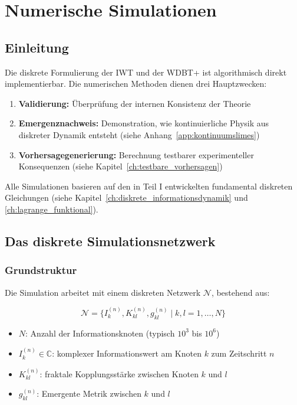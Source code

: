 
\chapter{Numerische Simulationen}
\label{app:numerik}

\section{Einleitung}
\label{app:numerik_einleitung}

Die diskrete Formulierung der IWT und der WDBT+ ist algorithmisch direkt implementierbar. Die numerischen Methoden dienen drei Hauptzwecken:

\begin{enumerate}
    \item \textbf{Validierung:} Überprüfung der internen Konsistenz der Theorie
    \item \textbf{Emergenznachweis:} Demonstration, wie kontinuierliche Physik aus diskreter Dynamik entsteht (siehe Anhang~\ref{app:kontinuumslimes})
    \item \textbf{Vorhersagegenerierung:} Berechnung testbarer experimenteller Konsequenzen (siehe Kapitel~\ref{ch:testbare_vorhersagen})
\end{enumerate}

Alle Simulationen basieren auf den in Teil I entwickelten fundamental diskreten Gleichungen (siehe Kapitel~\ref{ch:diskrete_informationsdynamik} und \ref{ch:lagrange_funktional}).

\section{Das diskrete Simulationsnetzwerk}
\label{app:numerik_netzwerk}

\subsection{Grundstruktur}
\label{sub:numerik_grundstruktur}

Die Simulation arbeitet mit einem diskreten Netzwerk \( \mathcal{N} \), bestehend aus:

\[
\mathcal{N} = \{ I_k^{(n)}, K_{kl}^{(n)}, g_{kl}^{(n)} \mid k, l = 1, \dots, N \}
\]

\begin{itemize}
    \item \( N \): Anzahl der Informationsknoten (typisch \( 10^3 \) bis \( 10^6 \))
    \item \( I_k^{(n)} \in \mathbb{C} \): komplexer Informationswert am Knoten \( k \) zum Zeitschritt \( n \)
    \item \( K_{kl}^{(n)} \): fraktale Kopplungsstärke zwischen Knoten \( k \) und \( l \)
    \item \( g_{kl}^{(n)} \): Emergente Metrik zwischen \( k \) und \( l \)
\end{itemize}

